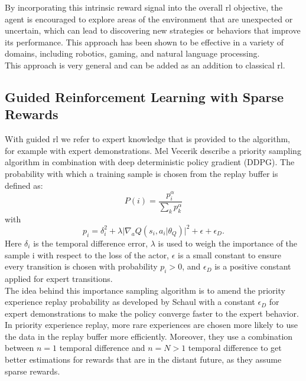 By incorporating this intrinsic reward signal into the overall \ac{rl} objective, the agent is encouraged to explore areas of the environment that are 
unexpected or uncertain, which can lead to discovering new strategies or behaviors that improve its performance. This approach has been shown to be effective in a variety of 
domains, including robotics, gaming, and natural language processing.\\

This approach is very general and can be added as an addition to classical \ac{rl}.

\subsection{Guided Reinforcement Learning with Sparse Rewards}
\label{sec:rel_work_finetuning}
With guided \ac{rl} we refer to expert knowledge that is provided to the algorithm, for example with expert demonstrations.
Mel Vecerik \etAl \cite{vecerik2018leveraging} describe a priority 
sampling algorithm in combination with deep deterministic policy gradient (DDPG). The probability with which a 
training sample is chosen from the replay buffer is defined as: 
\begin{equation}
    P(i) = \frac{p_i^\alpha}{\sum\limits_{k} p_k^\alpha}
\end{equation}
with 
\begin{equation}
    p_i = \delta_{i}^2 + \lambda \lvert \nabla_a Q(s_i, a_i \vert \theta_Q) \rvert^2 + \epsilon + \epsilon_{D}.
\end{equation}
Here $\delta_{i}$ is the temporal difference error, $\lambda$ is used to weigh the importance of the sample i with respect to the loss of the actor, 
$\epsilon$ is a small constant to ensure every transition is chosen with probability $p_i > 0$, and $\epsilon_D$ is a positive constant applied for expert transitions.\\
The idea behind this importance sampling algorithm is to amend the priority experience replay probability as developed by Schaul \etAl \cite{schaul2016prioritized} 
with a constant $\epsilon_{D}$ for expert demonstrations to make the policy converge faster to the expert behavior. In priority experience replay, more rare 
experiences are chosen more likely to use the data in the replay buffer more efficiently. Moreover, they use a combination between $n=1$ temporal difference and 
$n=N > 1$ temporal difference to get better estimations for rewards that are in the distant future, as they assume sparse rewards.\\
